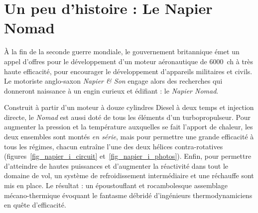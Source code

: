 \atstartofhistorysection
\section[Un peu d’histoire : le Napier Nomad]{Un peu d’histoire :\onlyamphibook{\\} Le Napier Nomad}
\label{ch_histoire_nomad}

À la fin de la seconde guerre mondiale, le gouvernement britannique émet un appel d’offres pour le développement d’un moteur aéronautique de \SI{6000}{ch} à très haute efficacité, pour encourager le développement d’appareils militaires et civils. Le motoriste anglo-saxon \textit{Napier \& Son} engage alors des recherches qui donneront naissance à un engin curieux et édifiant : le \textit{Napier Nomad}.

Construit à partir d’un moteur à douze cylindres Diesel à deux temps et injection directe, le \textit{Nomad} est aussi doté de tous les éléments d’un turbopropulseur. Pour augmenter la pression et la température auxquelles se fait l’apport de chaleur, les deux ensembles sont montés \emph{en série}, mais pour permettre une grande efficacité à tous les régimes, chacun entraîne l’une des deux hélices contra-rotatives (figures~\ref{fig_napier_i_circuit} et~\ref{fig_napier_i_photos}). Enfin, pour permettre d’atteindre de hautes puissances et d’augmenter la réactivité dans tout le domaine de vol, un système de refroidissement intermédiaire et une réchauffe sont mis en place. Le résultat : un époustouflant et rocambolesque assemblage mécano-thermique évoquant le fantasme débridé d’ingénieurs thermodynamiciens en quête d’efficacité.


